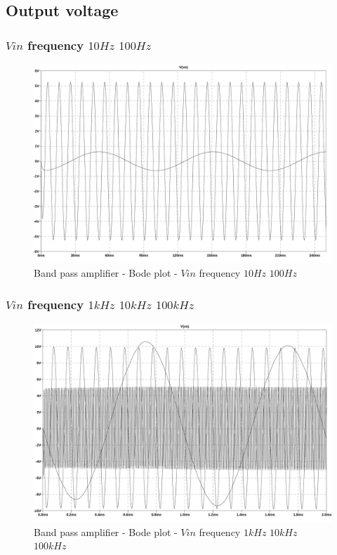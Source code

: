 \documentclass[10pt,a4paper]{article}
\begin{document}
\subsection{Output voltage}
\subsubsection{$Vin$ frequency $10Hz$ $100Hz$}


\begin{figure}[H]
  \centering
  \includegraphics[width=14cm]{graph/2d4a.jpg}
  \caption{Band pass amplifier - Bode plot - $Vin$ frequency $10Hz$ $100Hz$}
  \label{2d4agraph}
\end{figure}

\subsubsection{$Vin$ frequency $1kHz$ $10kHz$ $100kHz$}


\begin{figure}[H]
  \centering
  \includegraphics[width=14cm]{graph/2d4b.jpg}
  \caption{Band pass amplifier - Bode plot - $Vin$ frequency $1kHz$ $10kHz$ $100kHz$}
  \label{2d4bgraph}
\end{figure}
\end{document}
